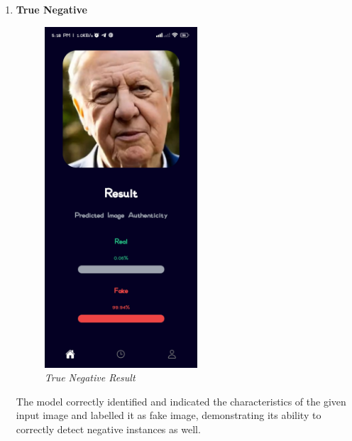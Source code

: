 \begin{enumerate}
    \item \textbf{True Negative}
      \\
          \begin{figure}[ht]
              \centering
              \includegraphics[height =5in ]{img/oldmanResult.jpg}
              \caption{\textit{True Negative Result}}
          \end{figure}
       
          The model correctly identified and indicated the characteristics of the given input image and labelled it as fake image, demonstrating its ability to correctly detect negative instances as well.
          \newpage



\end{enumerate}
